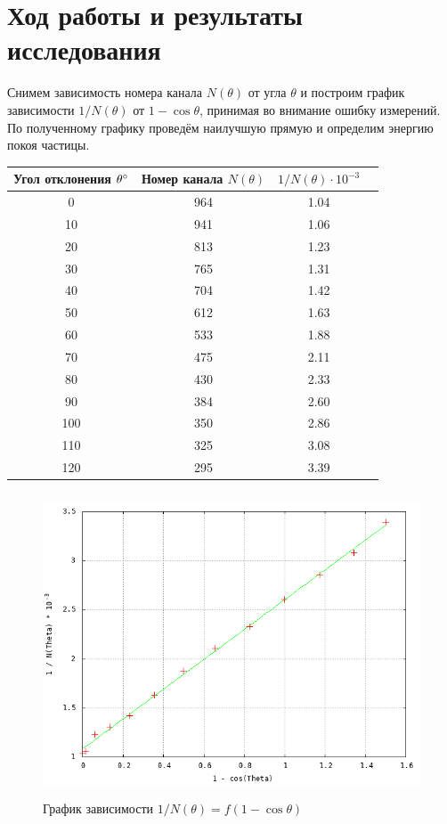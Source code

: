 \documentclass[12pt]{article}
\begin{document}
\section*{Ход работы и результаты исследования}
\par
	Снимем зависимость номера канала $N(\theta)$ от угла $\theta$ и построим график зависимости $1 / N(\theta)$ от $1 - \cos \theta$, принимая во внимание ошибку измерений. По полученному графику проведём наилучшую прямую и определим энергию покоя частицы.
\newpage
\begin{table}[h!]
	\centering
	\begin{tabular}{|c|c|c|c}
	\hline
		Угол отклонения $\theta \degree$ & Номер канала $N(\theta)$ & $1 / N(\theta) \cdot 10^{-3}$ \\
	\hline
		0&	964	&1.04 \\
	\hline
10	&941& 1.06 \\
\hline
20	&813& 1.23 \\
\hline
30	&765& 1.31 \\
\hline
40	&704&	1.42 \\
\hline
50	&612&	1.63 \\
\hline
60	&533&	1.88 \\
\hline
70	&475&	2.11 \\ 
\hline
80	&430&	2.33 \\	
\hline
90	&384&	2.60 \\
\hline
100	&350&	2.86 \\
\hline
110	&325&	3.08 \\
\hline
120	&295&	3.39 \\
	\hline
	\end{tabular}
\end{table}
\begin{figure}[h!]
	\centering
	\includegraphics[width = 14cm, height = 9cm]{plot1.png}
	\caption{График зависимости $1 / N(\theta) = f \left(1 - \cos \theta \right)$}	
\end{figure}
\end{document}
